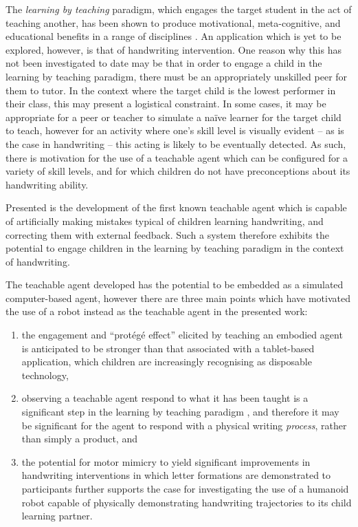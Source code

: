 \documentclass{sig-alternate}
\begin{document}
The \emph{learning by teaching} paradigm, which engages the target student in
the act of teaching another, has been shown to produce motivational,
meta-cognitive, and educational benefits in a range of disciplines
\cite{Rohrbeck2003}. An application which is yet to be explored, however, is
that of handwriting intervention. One reason why this has not been investigated
to date may be that in order to engage a child in the learning by teaching
paradigm, there must be an appropriately unskilled peer for them to tutor. In
the context where the target child is the lowest performer in their class, this
may present a logistical constraint. In some cases, it may be appropriate for a
peer or teacher to simulate a na\"ive learner for the target child to teach,
however for an activity where one's skill level is visually evident -- as is the
case in handwriting -- this acting is likely to be eventually detected. As such,
there is motivation for the use of a teachable agent which can be configured for
a variety of skill levels, and for which children do not have preconceptions
about its handwriting ability.

Presented is the development of the first known teachable agent which is capable
of artificially making mistakes typical of children learning handwriting, and
correcting them with external feedback. Such a system therefore exhibits the potential
to engage children in the learning by teaching paradigm in the context of
handwriting. 

The teachable agent developed has the potential to be embedded as a simulated 
computer-based agent, however there are three main points which have motivated 
the use of a robot instead as the teachable agent in the presented work:

\begin{enumerate}
    \item the engagement and ``protégé effect'' elicited by teaching an embodied
        agent is anticipated to be stronger than that associated with a
        tablet-based application, which children are increasingly recognising as
        disposable technology,%
%
%

    \item observing a teachable agent respond to what it has been taught
        is a significant step in the learning by teaching
        paradigm \cite{Okita2006}, and therefore it may be significant for the agent to respond
        with a physical writing \emph{process}, rather than simply a product, and

    \item the potential for motor mimicry to yield significant improvements in
        handwriting interventions in which letter formations are demonstrated to participants \cite{Berninger1997} further supports the case
        for investigating the use of a humanoid robot capable of physically
        demonstrating handwriting trajectories to its child learning partner.
\end{enumerate}
\end{document}
